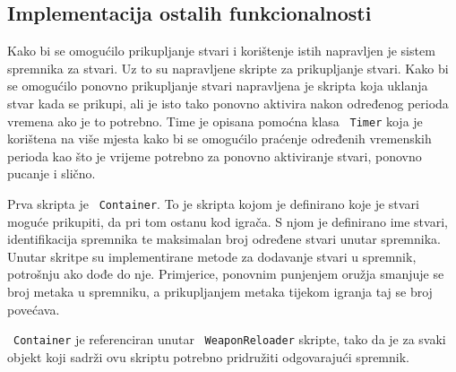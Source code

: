 \subsection{Implementacija ostalih funkcionalnosti}
Kako bi se omogućilo prikupljanje stvari i korištenje istih napravljen je sistem
spremnika za stvari. Uz to su napravljene skripte za prikupljanje stvari. Kako bi se
omogućilo ponovno prikupljanje stvari napravljena je skripta koja uklanja stvar kada
se prikupi, ali je isto tako ponovno aktivira nakon određenog perioda vremena ako je
to potrebno. Time je opisana pomoćna klasa ~\texttt{Timer} koja je korištena na više mjesta
kako bi se omogućilo praćenje određenih vremenskih perioda kao što je vrijeme
potrebno za ponovno aktiviranje stvari, ponovno pucanje i slično.

Prva skripta je ~\texttt{Container}. To je skripta kojom je definirano koje je stvari moguće
prikupiti, da pri tom ostanu kod igrača. S njom je definirano ime stvari,
identifikacija spremnika te maksimalan broj određene stvari unutar spremnika. Unutar
skritpe su implementirane metode za dodavanje stvari u spremnik, potrošnju ako dođe
do nje. Primjerice, ponovnim punjenjem oružja smanjuje se broj metaka u spremniku, a
prikupljanjem metaka tijekom igranja taj se broj povećava. 

~\texttt{Container} je referenciran unutar ~\texttt{WeaponReloader} skripte, tako da je za svaki objekt
koji sadrži ovu skriptu potrebno pridružiti odgovarajući spremnik. 

